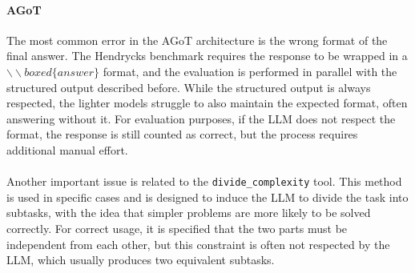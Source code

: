 \documentclass[12pt,a4paper,openright,twoside]{book}
\begin{document}
\paragraph{\ac{AGoT}}{The most common error in the \ac{AGoT} architecture is the wrong format of the final answer. The Hendrycks benchmark requires the response to be wrapped in a \texttt{$\backslash\backslash boxed\{answer\}$} format, and the evaluation is performed in parallel with the structured output described before.
While the structured output is always respected, the lighter models struggle to also maintain the expected format, often answering without it. 
For evaluation purposes, if the \ac{LLM} does not respect the format, the response is still counted as correct, but the process requires additional manual effort.
\\\\
Another important issue is related to the \texttt{divide\_complexity} tool.
This method is used in specific cases and is designed to induce the \ac{LLM} to divide the task into subtasks, with the idea that simpler problems are more likely to be solved correctly.
For correct usage, it is specified that the two parts must be independent from each other, but this constraint is often not respected by the \ac{LLM}, which usually produces two equivalent subtasks.
}
\end{document}
